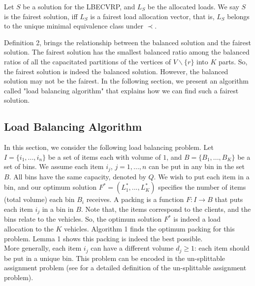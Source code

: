 \begin{definition} Let $S$ be a solution for the LBECVRP, and $L_S$ be the allocated loads. We say $S$ is the fairest solution, iff $L_S$ is a fairest load allocation vector, that is, $L_S$ belongs to the unique minimal equivalence class under $\prec$.
\end{definition} 

\indent Definition 2, brings the relationship between the balanced solution and the fairest solution. The fairest solution has the smallest balanced ratio among the balanced ratios of all the capacitated partitions of the vertices of $V\backslash \{r\}$ into $K$ parts. So, the fairest solution is indeed the balanced solution. However, the balanced solution may not be the fairest. In the following section, we present an algorithm called "load balancing algorithm" that explains how we can find such a fairest solution.  
\subsection{Load Balancing Algorithm}
\noindent In this section, we consider the following load balancing problem. Let $I = \{ {i_1},...,{i_n}\}$ be a set of items each with volume of $1$, and $B = \{ {B_1},...,{B_K}\} $ be a set of bins. We assume each item $i_j$, $j=1,...,n$ can be put in any bin in the set $B$. All bins have the same capacity, denoted by $Q$. We wish to put each item in a bin, and our optimum solution $F^* = ({L^*_1},...,{L^*_K})$  specifies the number of items (total volume) each bin $B_i$ receives. A packing is a function $F: I \to B$ that puts each item $i_j$ in a bin in $B$. Note that, the items correspond to the clients, and the bins relate to the vehicles. So, the optimum solution $F^*$ is indeed a load allocation to the $K$ vehicles. Algorithm 1 finds the optimum packing for this problem. Lemma 1 shows this packing is indeed the best possible.\\
\indent More generally, each item $i_j$ can have a different volume $d_j\ge 1$: each item should be put in a unique bin. This problem can be encoded in the un-splittable assignment problem (see \cite{Lenstra} for a detailed definition of the un-splittable assignment problem). \\


